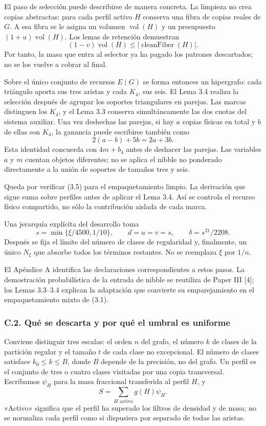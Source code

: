 \documentclass[spanish,11pt,a4paper]{article}
\begin{document}
El paso de selección puede describirse de manera concreta. La limpieza no crea copias abstractas: para cada perfil activo \(H\) conserva una fibra de copias reales de \(G\). A esa fibra se le asigna un volumen \(\operatorname{vol}(H)\) y un presupuesto \((1+u)\operatorname{vol}(H)\). Los lemas de retención demuestran \[
(1-v)\operatorname{vol}(H)
\le |\operatorname{cleanFiber}(H)|.
\tag{3.8}
\] Por tanto, la masa que entra al selector ya ha pagado los patrones descartados; no se los vuelve a cobrar al final.

Sobre el único conjunto de recursos \(E(G)\) se forma entonces un hipergrafo: cada triángulo aporta sus tres aristas y cada \(K_4\), sus seis. El Lema 3.4 realiza la selección después de agrupar los soportes triangulares en parejas. Las marcas distinguen los \(K_4\), y el Lema 3.3 conserva simultáneamente las dos cuotas del sistema auxiliar. Una vez deshechas las parejas, si hay \(a\) copias físicas en total y \(b\) de ellas son \(K_4\), la ganancia puede escribirse también como \[
2(a-b)+5b=2a+3b.
\tag{3.9}
\] Esta identidad concuerda con \(4m+b_4\) antes de deshacer las parejas. Las variables \(a\) y \(m\) cuentan objetos diferentes; no se aplica el nibble no ponderado directamente a la unión de soportes de tamaños tres y seis.

Queda por verificar (3.5) para el empaquetamiento limpio. La derivación que sigue suma sobre perfiles antes de aplicar el Lema 3.4. Así se controla el recurso físico compartido, no sólo la contribución aislada de cada marca.

Una jerarquía explícita del desarrollo toma \[
s=\min\{\xi/4500,1/10\},\qquad
d=u=v=s,\qquad \delta=s^{21}/2208.
\] Después se fija el límite del número de clases de regularidad y, finalmente, un único \(N_\xi\) que absorbe todos los términos restantes. No se reemplaza \(\xi\) por \(1/n\).

El Apéndice A identifica las declaraciones correspondientes a estos pasos. La demostración probabilística de la entrada de nibble se reutiliza de Paper III {[}4{]}; los Lemas 3.3--3.4 explican la adaptación que convierte su emparejamiento en el empaquetamiento mixto de (3.1).

\subsubsection{C.2. Qué se descarta y por qué el umbral es uniforme}\label{c.2.-quuxe9-se-descarta-y-por-quuxe9-el-umbral-es-uniforme}

Conviene distinguir tres escalas: el orden \(n\) del grafo, el número \(k\) de clases de la partición regular y el tamaño \(t\) de cada clase no excepcional. El número de clases satisface \(k_0\le k\le B\), donde \(B\) depende de la precisión, no del grafo. Un perfil es el conjunto de tres o cuatro clases visitadas por una copia transversal. Escribamos \(\psi_H\) para la masa fraccional transferida al perfil \(H\), y \[
S=\sum_{H\text{ activo}}g(H)\psi_H.
\] «Activo» significa que el perfil ha superado los filtros de densidad y de masa; no se normaliza cada perfil como si dispusiera por separado de todas las aristas.
\end{document}
